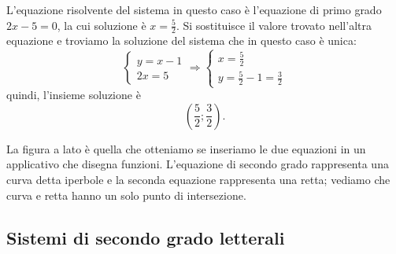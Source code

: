 \begin{exrig}
\begin{esempio}
L'equazione risolvente del sistema in questo caso è l'equazione di primo grado $2x-5=0$, la cui soluzione è $x=\frac 5 2$. Si sostituisce il valore trovato nell'altra equazione e troviamo la soluzione del sistema che in questo caso è unica: 
\[\left\{\begin{array}{l}y=x-1 \\2x=5\end{array}\right. 
\Rightarrow\left\{\begin{array}{l}x=\frac 5 2 \\
y=\frac 5 2-1=\frac 3 2\end{array}\right.\] 
quindi, l'insieme soluzione è \[\left(\frac 5 2;\frac 3 2\right).\]

\begin{multicols}{2}
La figura a lato è quella che otteniamo se inseriamo le due equazioni in un applicativo che disegna funzioni. L'equazione di secondo grado rappresenta una curva detta iperbole e la seconda equazione rappresenta una retta; vediamo che curva e retta hanno un solo punto di intersezione.
\begin{center}

\end{center}
\end{multicols}
\end{esempio}
\end{exrig}
\ovalbox{\risolvii \ref{ese:6.1}, \ref{ese:6.2}, \ref{ese:6.3}, \ref{ese:6.4}, \ref{ese:6.5}, \ref{ese:6.6}, \ref{ese:6.7}, \ref{ese:6.8}, \ref{ese:6.9}, \ref{ese:6.10}, \ref{ese:6.11}, \ref{ese:6.12}, \ref{ese:6.13}}

\subsection{Sistemi di secondo grado letterali}

